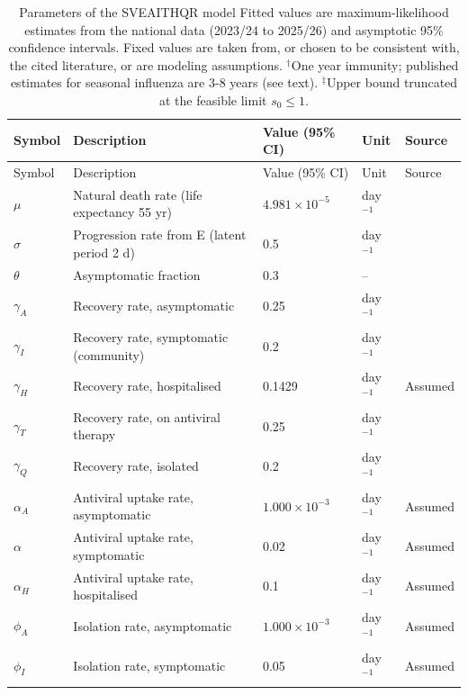 \documentclass[12pt,a4paper]{article}
\theoremstyle{definition}
\theoremstyle{remark}
\begin{document}
\setlength{\tabcolsep}{4pt}
\begin{longtable}{p{1.5cm}p{4.6cm}p{4.3cm}p{1.9cm}p{2.0cm}}
\caption{Parameters of the SVEAITHQR model Fitted values are maximum-likelihood estimates from the national data (2023/24 to 2025/26) and asymptotic 95\% confidence intervals. Fixed values are taken from, or chosen to be consistent with, the cited literature, or are modeling assumptions. $^{\dagger}$One year immunity; published estimates for seasonal influenza are 3-8 years \cite{truscott2012essential} (see text). $^{\ddagger}$Upper bound truncated at the feasible limit $s_0 \le 1$.}
\label{tab:parameters}\\
\hline
Symbol & Description & Value (95\% CI) & Unit & Source\\ \hline
\endfirsthead
\hline
Symbol & Description & Value (95\% CI) & Unit & Source\\ \hline
\endhead
\hline
\endfoot
$\mu$ & Natural death rate (life expectancy 55 yr) & $4.981\times10^{-5}$ & day$^{-1}$ & \cite{worldbank2025lifeexp}\\
$\sigma$ & Progression rate from E (latent period 2 d) & 0.5 & day$^{-1}$ & \cite{lessler2009incubation,carrat2008timelines}\\
$\theta$ & Asymptomatic fraction & 0.3 & -- & \cite{carrat2008timelines,leung2015asymptomatic,furuya2016heterogeneous}\\
$\gamma_A$ & Recovery rate, asymptomatic & 0.25 & day$^{-1}$ & \cite{carrat2008timelines}\\
$\gamma_I$ & Recovery rate, symptomatic (community) & 0.2 & day$^{-1}$ & \cite{carrat2008timelines}\\
$\gamma_H$ & Recovery rate, hospitalised & 0.1429 & day$^{-1}$ & Assumed\\
$\gamma_T$ & Recovery rate, on antiviral therapy & 0.25 & day$^{-1}$ & \cite{dobson2015oseltamivir}\\
$\gamma_Q$ & Recovery rate, isolated & 0.2 & day$^{-1}$ & \cite{carrat2008timelines}\\
$\alpha_A$ & Antiviral uptake rate, asymptomatic & $1.000\times10^{-3}$ & day$^{-1}$ & Assumed\\
$\alpha$ & Antiviral uptake rate, symptomatic & 0.02 & day$^{-1}$ & Assumed\\
$\alpha_H$ & Antiviral uptake rate, hospitalised & 0.1 & day$^{-1}$ & Assumed\\
$\phi_A$ & Isolation rate, asymptomatic & $1.000\times10^{-3}$ & day$^{-1}$ & Assumed\\
$\phi_I$ & Isolation rate, symptomatic & 0.05 & day$^{-1}$ & Assumed\\

\end{longtable}
\end{document}
